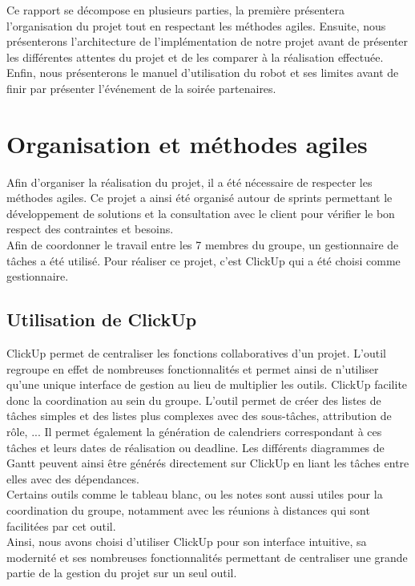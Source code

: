 \documentclass[a4paper,french]{article}
\begin{document}
Ce rapport se décompose en plusieurs parties, la première présentera l'organisation du projet tout en respectant les méthodes agiles. Ensuite, nous présenterons l'architecture de l'implémentation de notre projet avant de présenter les différentes attentes du projet et de les comparer à la réalisation effectuée. Enfin, nous présenterons le manuel d'utilisation du robot et ses limites avant de finir par présenter l'événement de la soirée partenaires.

\newpage

\section{Organisation et méthodes agiles}
Afin d'organiser la réalisation du projet, il a été nécessaire de respecter les méthodes agiles. Ce projet a ainsi été organisé autour de sprints permettant le développement de solutions et la consultation avec le client pour vérifier le bon respect des contraintes et besoins. \\

Afin de coordonner le travail entre les 7 membres du groupe, un gestionnaire de tâches a été utilisé. Pour réaliser ce projet, c'est ClickUp qui a été choisi comme gestionnaire.

\subsection{Utilisation de ClickUp}
ClickUp permet de centraliser les fonctions collaboratives d'un projet. L'outil regroupe en effet de nombreuses fonctionnalités et permet ainsi de n'utiliser qu'une unique interface de gestion au lieu de multiplier les outils. ClickUp facilite donc la coordination au sein du groupe. L'outil permet de créer des listes de tâches simples et des listes plus complexes avec des sous-tâches, attribution de rôle, ... Il permet également la génération de calendriers correspondant à ces tâches et leurs dates de réalisation ou deadline. Les différents diagrammes de Gantt peuvent ainsi être générés directement sur ClickUp en liant les tâches entre elles avec des dépendances. \\

Certains outils comme le tableau blanc, ou les notes sont aussi utiles pour la coordination du groupe, notamment avec les réunions à distances qui sont facilitées par cet outil. \\

Ainsi, nous avons choisi d'utiliser ClickUp pour son interface intuitive, sa modernité et ses nombreuses fonctionnalités permettant de centraliser une grande partie de la gestion du projet sur un seul outil.
\end{document}
